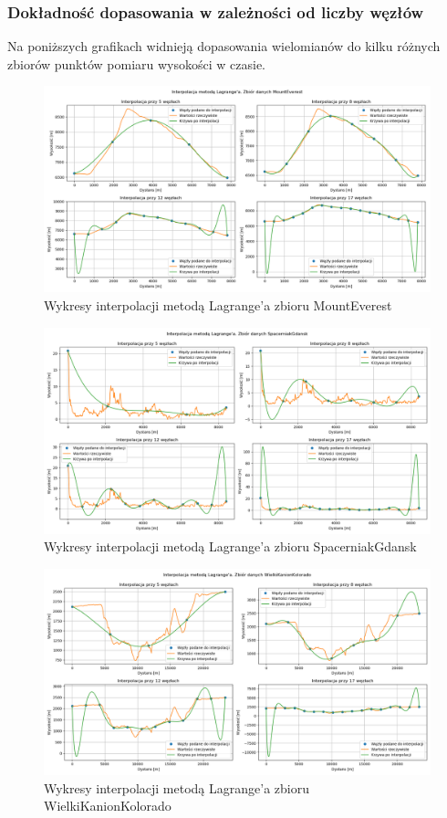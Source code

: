 \documentclass{article} %
\begin{document}
\subsubsection{Dokładność dopasowania w zależności od liczby węzłów}
Na poniższych grafikach widnieją dopasowania wielomianów do kilku różnych zbiorów punktów pomiaru wysokości w czasie.
\begin{figure}[H]
    \centering
    \includegraphics[scale=0.42]{../plots/lagrange_MountEverest.png}
    \caption{Wykresy interpolacji metodą Lagrange'a zbioru MountEverest}
\end{figure}
\begin{figure}[H]
    \centering
    \includegraphics[scale=0.42]{../plots/lagrange_SpacerniakGdansk.png}
    \caption{Wykresy interpolacji metodą Lagrange'a zbioru SpacerniakGdansk}
\end{figure}
\begin{figure}[H]
    \centering
    \includegraphics[scale=0.42]{../plots/lagrange_WielkiKanionKolorado.png}
    \caption{Wykresy interpolacji metodą Lagrange'a zbioru WielkiKanionKolorado}
\end{figure}
\end{document}
